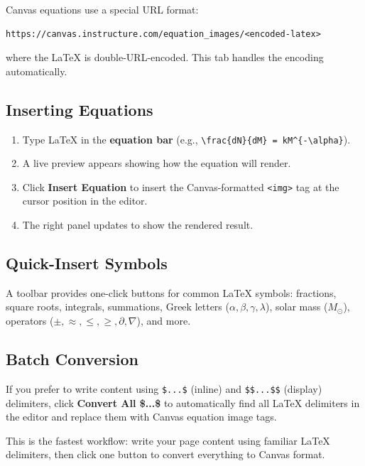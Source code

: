 \documentclass[12pt,letterpaper]{article}
\begin{document}
Canvas equations use a special URL format:
\begin{lstlisting}
https://canvas.instructure.com/equation_images/<encoded-latex>
\end{lstlisting}
where the \LaTeX{} is double-URL-encoded. This tab handles the encoding automatically.

\subsection{Inserting Equations}

\begin{enumerate}[leftmargin=*]
    \item Type \LaTeX{} in the \textbf{equation bar} (e.g., \texttt{\textbackslash frac\{dN\}\{dM\} = kM\^{}\{-\textbackslash alpha\}}).
    \item A live preview appears showing how the equation will render.
    \item Click \textbf{Insert Equation} to insert the Canvas-formatted \texttt{<img>} tag at the cursor position in the editor.
    \item The right panel updates to show the rendered result.
\end{enumerate}

\subsection{Quick-Insert Symbols}

A toolbar provides one-click buttons for common \LaTeX{} symbols: fractions, square roots, integrals, summations, Greek letters ($\alpha, \beta, \gamma, \lambda$), solar mass ($M_\odot$), operators ($\pm, \approx, \leq, \geq, \partial, \nabla$), and more.

\subsection{Batch Conversion}

If you prefer to write content using \texttt{\$...\$} (inline) and \texttt{\$\$...\$\$} (display) delimiters, click \textbf{Convert All \$...\$} to automatically find all \LaTeX{} delimiters in the editor and replace them with Canvas equation image tags.

\begin{tipbox}
This is the fastest workflow: write your page content using familiar \LaTeX{} delimiters, then click one button to convert everything to Canvas format.
\end{tipbox}
\end{document}
